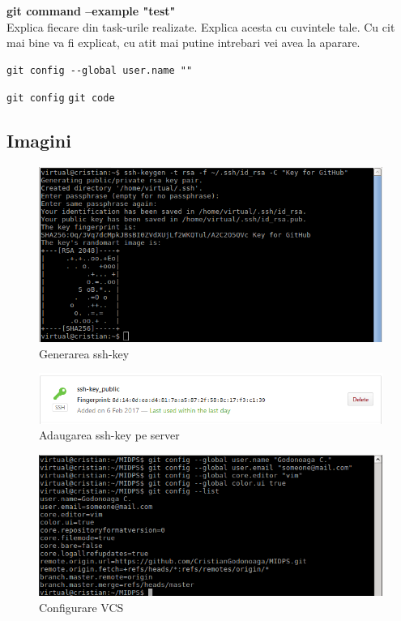 \textbf{git command --example "test"}\\

Explica fiecare din task-urile realizate. Explica acesta cu cuvintele tale. Cu cit mai bine va fi explicat, cu atit mai putine intrebari vei avea la aparare.

\begin{lstlisting}
git config --global user.name ""
\end{lstlisting}

\newcommand{\code}[1]{\texttt{#1}}
\code{git config}
\tt git code



\subsection{Imagini}

\begin{figure}[htb]
	\begin{center}
		\centering
		\includegraphics[scale = 0.9]{img/ssh_key.png}
		\caption{Generarea ssh-key}%
		\label{fig:generarea_ssh_key}
	\end{center}
\end{figure}

\begin{figure}[htb]
	\begin{center}
		\centering
		\includegraphics[scale = 0.9]{img/add_key_onserver.png}
		\caption{Adaugarea ssh-key pe server}%
		\label{fig:add_key_onserver}
	\end{center}
\end{figure}

\begin{figure}[htb]
	\begin{center}
		\centering
		\includegraphics[scale = 0.9]{img/git_config.png}
		\caption{Configurare VCS}%
		\label{fig:git_config}
	\end{center}
\end{figure}
\clearpage